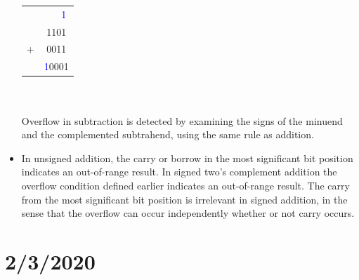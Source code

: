 \documentclass[10pt,a4paper]{article}
\begin{document}
\begin{itemize}
\begin{tabular}{cc}
  & \textcolor{white}{111}\textcolor{blue}{1}\\
  & 1101\\
+ & 0011\\
\hline
 & \textcolor{blue}{1}0001
\end{tabular}\\~\\
Overflow in subtraction is detected by examining the signs of the minuend and the complemented subtrahend, using the same rule as addition. 
\item In unsigned addition, the carry or borrow in the most significant bit position indicates an out-of-range result. In signed two's complement addition the overflow condition defined earlier indicates an out-of-range result. The carry from the most significant bit position is irrelevant in signed addition, in the sense that the overflow can occur independently whether or not carry occurs. 
\end{itemize}
\section{2/3/2020}
\end{document}
